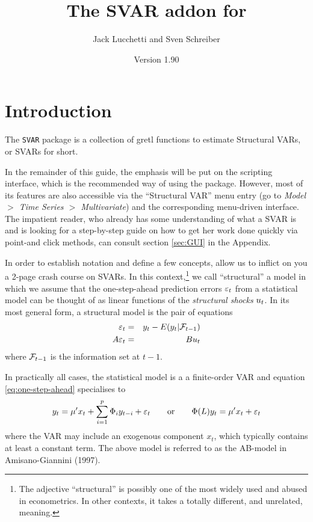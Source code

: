 \documentclass[a4paper,10pt]{article}
\title{The SVAR addon for \app{gretl}}
\author{Jack Lucchetti and Sven Schreiber}
\date{Version 1.90}
\newcommand{\app}[1]{\textsf{#1}}
\newcounter{script}[section]
\newcommand{\PrE}[1]{\ensuremath \varepsilon_{#1}}
\newcommand{\StS}[1]{\ensuremath u_{#1}}
\newcommand{\InfSet}[1]{\ensuremath \mathcal{F}_{#1}}
\newcommand{\VarSym}{\ensuremath \Phi}
\begin{document}
\maketitle



\tableofcontents

\clearpage

\section{Introduction}
\label{sec:intro}

The \texttt{SVAR} package is a collection of \app{gretl} functions to
estimate Structural VARs, or SVARs for short. 

In the remainder of this guide, the emphasis will be put on the
scripting interface, which is the recommended way of using the
package. However, most of its features are also accessible via the
``Structural VAR'' menu entry (go to \emph{Model $>$ Time Series $>$
  Multivariate}) and the corresponding menu-driven interface. The
impatient reader, who already has some understanding of what a SVAR is
and is looking for a step-by-step guide on how to get her work done
quickly via point-and click methods, can consult section \ref{sec:GUI}
in the Appendix.

In order to establish notation and define a few concepts, allow us to
inflict on you a 2-page crash course on SVARs.  In this
context,\footnote{The adjective ``structural'' is possibly one of the
  most widely used and abused in econometrics. In other contexts, it
  takes a totally different, and unrelated, meaning.} we call
``structural'' a model in which we assume that the one-step-ahead
prediction errors $\PrE{t}$ from a statistical model can be thought of
as linear functions of the \emph{structural shocks} $\StS{t}$. In its
most general form, a structural model is the pair of equations
\begin{eqnarray}
  \label{eq:one-step-ahead}
  \PrE{t} & = & y_t - E(y_t | \InfSet{t-1}) \\
  \label{eq:PrE-StS-AB}
  A \PrE{t} & = & B \StS{t}
\end{eqnarray}
where $\InfSet{t-1}$ is the information set at $t-1$.

In practically all cases, the statistical model is a a finite-order
VAR and equation \eqref{eq:one-step-ahead} specialises to
\begin{equation}
  \label{eq:VAR}
  y_t = \mu' x_t + \sum_{i=1}^p \VarSym_i y_{t-i} + \PrE{t}
  \qquad\mathrm{or}\qquad
  \VarSym(L) y_t = \mu' x_t + \PrE{t}
\end{equation}
where the VAR may include an exogenous component $x_t$, which
typically contains at least a constant term. The above model is
referred to as the AB-model in Amisano-Giannini (1997).
\end{document}
